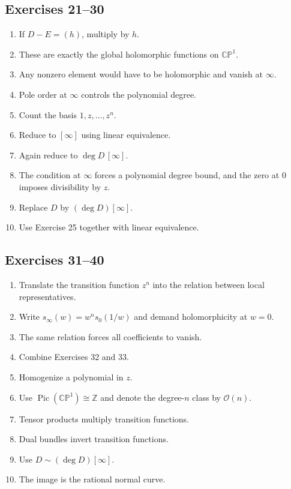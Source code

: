 \documentclass[11pt]{article}
\newcommand{\Z}{\mathbb{Z}}
\newcommand{\CP}{\mathbb{CP}}
\newcommand{\OO}{\mathcal{O}}
\newcommand{\Pic}{\operatorname{Pic}}
\newcommand{\degd}{\operatorname{deg}}
\newcommand{\CPone}{\CP^1}
\theoremstyle{plain}
\theoremstyle{definition}
\begin{document}
\subsection*{Exercises 21--30}
\begin{enumerate}[label=\textbf{\arabic*.}, start=21]
    \item If $D-E=(h)$, multiply by $h$.
    \item These are exactly the global holomorphic functions on $\CPone$.
    \item Any nonzero element would have to be holomorphic and vanish at $\infty$.
    \item Pole order at $\infty$ controls the polynomial degree.
    \item Count the basis $1,z,\dots,z^n$.
    \item Reduce to $[\infty]$ using linear equivalence.
    \item Again reduce to $\degd D\,[\infty]$.
    \item The condition at $\infty$ forces a polynomial degree bound, and the zero at $0$ imposes divisibility by $z$.
    \item Replace $D$ by $(\degd D)[\infty]$.
    \item Use Exercise 25 together with linear equivalence.
\end{enumerate}

\subsection*{Exercises 31--40}
\begin{enumerate}[label=\textbf{\arabic*.}, start=31]
    \item Translate the transition function $z^n$ into the relation between local representatives.
    \item Write $s_{\infty}(w)=w^n s_0(1/w)$ and demand holomorphicity at $w=0$.
    \item The same relation forces all coefficients to vanish.
    \item Combine Exercises 32 and 33.
    \item Homogenize a polynomial in $z$.
    \item Use $\Pic(\CPone)\cong\Z$ and denote the degree-$n$ class by $\OO(n)$.
    \item Tensor products multiply transition functions.
    \item Dual bundles invert transition functions.
    \item Use $D\sim (\degd D)[\infty]$.
    \item The image is the rational normal curve.
\end{enumerate}
\end{document}
